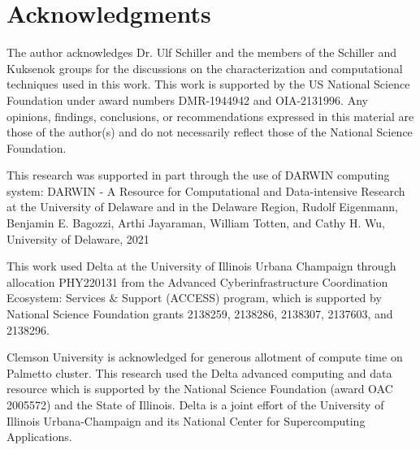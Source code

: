 \section{Acknowledgments}

The author acknowledges Dr. Ulf Schiller and the members of the Schiller and Kuksenok groups for the discussions on 
the characterization and computational techniques used in this work. This work is supported by the US National Science 
Foundation under award numbers DMR-1944942 and OIA-2131996. Any opinions, findings, conclusions, or recommendations 
expressed in this material are those of the author(s) and do not necessarily reflect those of the National Science 
Foundation.  

This research was supported in part through the use of DARWIN computing system: DARWIN - A Resource for Computational 
and Data-intensive Research at the University of Delaware and in the Delaware Region, Rudolf Eigenmann, Benjamin E. 
Bagozzi, Arthi Jayaraman, William Totten, and Cathy H. Wu, University of Delaware, 2021

This work used Delta at the University of Illinois Urbana Champaign through allocation PHY220131 from the Advanced 
Cyberinfrastructure Coordination Ecosystem: Services $\&$ Support (ACCESS) program, which is supported by National 
Science Foundation grants 2138259, 2138286, 2138307, 2137603, and 2138296. 

Clemson University is acknowledged for generous allotment of compute time on Palmetto cluster. This research used the 
Delta advanced computing and data resource which is supported by the National Science Foundation (award OAC 2005572) 
and the State of Illinois. Delta is a joint effort of the University of Illinois Urbana-Champaign and its National 
Center for Supercomputing Applications. 